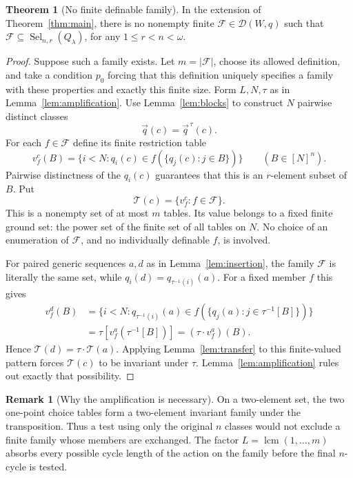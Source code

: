 \documentclass[11pt,letterpaper]{article}
\theoremstyle{definition}
\newtheorem{theorem}[definition]{Theorem}
\newtheorem{remark}[definition]{Remark}
\numberwithin{equation}{section}
\newcommand{\lcm}{\operatorname{lcm}}
\newcommand{\Sel}{\operatorname{Sel}}
\newcommand{\DD}{\mathscr D}
\begin{document}
\begin{theorem}[No finite definable family]\label{thm:nofinite}
In the extension of Theorem~\ref{thm:main}, there is no nonempty finite $\mathcal F\in\DD(W,q)$ such that
$\mathcal F\subseteq\Sel_{n,r}(Q_\lambda)$, for any $1\leq r<n<\omega$.
\end{theorem}
\begin{proof}
Suppose such a family exists. Let $m=|\mathcal F|$, choose its allowed definition, and take a condition $p_0$ forcing that this definition uniquely specifies a family with these properties and exactly this finite size. Form $L,N,\tau$ as in Lemma~\ref{lem:amplification}. Use Lemma~\ref{lem:blocks} to construct $N$ pairwise distinct classes
\[
 \vec q(c)=\vec q^{\,\tau}(c).
\]
For each $f\in\mathcal F$ define its finite restriction table
\[
 v_f^c(B)=\{i<N:q_i(c)\in f(\{q_j(c):j\in B\})\}
 \qquad(B\in[N]^n).
\]
Pairwise distinctness of the $q_i(c)$ guarantees that this is an $r$-element subset of $B$. Put
\[
 \mathcal T(c)=\{v_f^c:f\in\mathcal F\}.
\]
This is a nonempty set of at most $m$ tables. Its value belongs to a fixed finite ground set: the power set of the finite set of all tables on $N$. No choice of an enumeration of $\mathcal F$, and no individually definable $f$, is involved.

For paired generic sequences $a,d$ as in Lemma~\ref{lem:insertion}, the family $\mathcal F$ is literally the same set, while $q_i(d)=q_{\tau^{-1}(i)}(a)$. For a fixed member $f$ this gives
\begin{align*}
 v_f^d(B)
 &=\{i<N:q_{\tau^{-1}(i)}(a)
        \in f(\{q_j(a):j\in\tau^{-1}[B]\})\}\\
 &=\tau[v_f^a(\tau^{-1}[B])]
   =(\tau\cdot v_f^a)(B).
\end{align*}
Hence $\mathcal T(d)=\tau\cdot\mathcal T(a)$. Applying Lemma~\ref{lem:transfer} to this finite-valued pattern forces $\mathcal T(c)$ to be invariant under $\tau$. Lemma~\ref{lem:amplification} rules out exactly that possibility.
\end{proof}

\begin{remark}[Why the amplification is necessary]
On a two-element set, the two one-point choice tables form a two-element invariant family under the transposition. Thus a test using only the original $n$ classes would not exclude a finite family whose members are exchanged. The factor $L=\lcm(1,\ldots,m)$ absorbs every possible cycle length of the action on the family before the final $n$-cycle is tested.
\end{remark}
\end{document}
